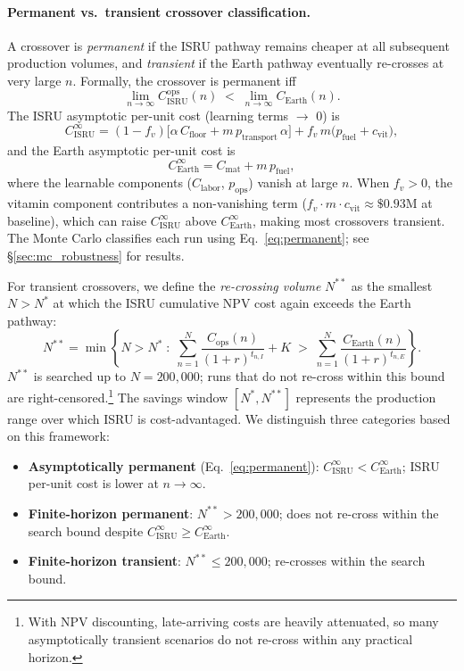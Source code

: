 \documentclass[preprint,12pt]{elsarticle}
\begin{document}
\paragraph{Permanent vs.\ transient crossover classification.} A crossover is \emph{permanent} if the ISRU pathway remains cheaper at all subsequent production volumes, and \emph{transient} if the Earth pathway eventually re-crosses at very large $n$. Formally, the crossover is permanent iff
\begin{equation}
  \lim_{n \to \infty} C_{\mathrm{ISRU}}^{\mathrm{ops}}(n) \;<\; \lim_{n \to \infty} C_{\mathrm{Earth}}(n).
  \label{eq:permanent}
\end{equation}
The ISRU asymptotic per-unit cost (learning terms $\to$ 0) is
\[
  C_{\mathrm{ISRU}}^{\infty} = (1 - f_v)\bigl[\alpha \, C_{\mathrm{floor}} + m \, p_{\mathrm{transport}} \, \alpha\bigr] + f_v \, m \bigl(p_{\mathrm{fuel}} + c_{\mathrm{vit}}\bigr),
\]
and the Earth asymptotic per-unit cost is
\[
  C_{\mathrm{Earth}}^{\infty} = C_{\mathrm{mat}} + m \, p_{\mathrm{fuel}},
\]
where the learnable components ($C_{\mathrm{labor}}$, $p_{\mathrm{ops}}$) vanish at large $n$. When $f_v > 0$, the vitamin component contributes a non-vanishing term ($f_v \cdot m \cdot c_{\mathrm{vit}} \approx \$0.93$M at baseline), which can raise $C_{\mathrm{ISRU}}^{\infty}$ above $C_{\mathrm{Earth}}^{\infty}$, making most crossovers transient. The Monte Carlo classifies each run using Eq.~\ref{eq:permanent}; see \S\ref{sec:mc_robustness} for results.

For transient crossovers, we define the \emph{re-crossing volume} $N^{**}$ as the smallest $N > N^*$ at which the ISRU cumulative NPV cost again exceeds the Earth pathway:
\begin{equation}
  N^{**} = \min\!\left\{N > N^* \;:\; \sum_{n=1}^{N} \frac{C_{\mathrm{ops}}(n)}{(1+r)^{t_{n,I}}} + K \;>\; \sum_{n=1}^{N} \frac{C_{\mathrm{Earth}}(n)}{(1+r)^{t_{n,E}}}\right\}.
  \label{eq:recrossing}
\end{equation}
$N^{**}$ is searched up to $N = 200{,}000$; runs that do not re-cross within this bound are right-censored.\footnote{With NPV discounting, late-arriving costs are heavily attenuated, so many asymptotically transient scenarios do not re-cross within any practical horizon.} The savings window $[N^*, N^{**}]$ represents the production range over which ISRU is cost-advantaged. We distinguish three categories based on this framework:
\begin{itemize}
\item \textbf{Asymptotically permanent} (Eq.~\ref{eq:permanent}): $C_{\mathrm{ISRU}}^{\infty} < C_{\mathrm{Earth}}^{\infty}$; ISRU per-unit cost is lower at $n \to \infty$.
\item \textbf{Finite-horizon permanent}: $N^{**} > 200{,}000$; does not re-cross within the search bound despite $C_{\mathrm{ISRU}}^{\infty} \geq C_{\mathrm{Earth}}^{\infty}$.
\item \textbf{Finite-horizon transient}: $N^{**} \leq 200{,}000$; re-crosses within the search bound.
\end{itemize}
\end{document}

